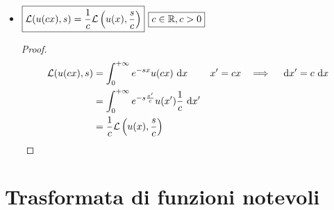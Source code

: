 \begin{itemize}
\begin{proof}
\begin{equation*}
\Lc\left(e^{s_{0} x} u(x), s\right) = \int^{+ \infty}_{0} e^{- x(s - s_{0})} u(x) \dx = \Lc(u(x), s - s_{0})
\end{equation*}
\end{proof}
\item $\boxed{\mathcal{L}(u(cx), s) = \frac{1}{c}\mathcal{L}\left(u(x), \frac{s}{c}\right)}$ $\boxed{c\in \mathbb{R}, c > 0}$

\begin{proof}
\begin{align*}
\mathcal{L}(u(cx), s) & = \int^{+ \infty}_{0} e^{- sx} u(cx) \  \mathrm{d} x & x' = cx\ \ \implies \ \ \  \mathrm{d} x' = c\  \mathrm{d} x\\
 & = \int^{+ \infty}_{0} e^{- s\frac{x'}{c}} u(x')\frac{1}{c} \  \mathrm{d} x' & \\
 & = \frac{1}{c}\mathcal{L}\left(u(x), \frac{s}{c}\right) &
\end{align*}
\end{proof}
\end{itemize}

\section{Trasformata di funzioni notevoli}

